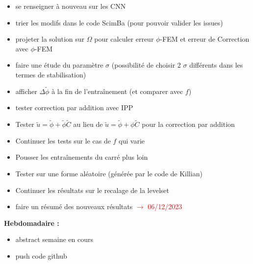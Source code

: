 \begin{itemize}[label=$\square$]
	\item se renseigner à nouveau sur les CNN
	\item trier les modifs dans le code ScimBa (pour pouvoir valider les issues)
	\item[\done] projeter la solution sur $\Omega$ pour calculer erreur $\phi$-FEM et erreur de Correction avec $\phi$-FEM
	\item faire une étude du paramètre $\sigma$ (possibilité de choisir 2 $\sigma$ différents dans les termes de stabilisation)
	\item afficher $\Delta \tilde{\phi}$ à la fin de l'entraînement (et comparer avec $f$)
	\item tester correction par addition avec IPP
	\item Tester $\tilde{u}=\tilde{\phi}+\tilde{\phi}\tilde{C}$ au lieu de $\tilde{u}=\tilde{\phi}+\phi\tilde{C}$ pour la correction par addition
	\item[\done] Continuer les tests sur le cas de $f$ qui varie
	\item Pousser les entraînements du carré plus loin
	\item Tester sur une forme aléatoire (générée par le code de Killian)
	\item[\done] Continuer les résultats sur le recalage de la levelset
	\item[\done] faire un résumé des nouveaux résultats \textcolor{red}{$\rightarrow$ 06/12/2023}
\end{itemize}
\textbf{Hebdomadaire :}
\begin{itemize}[label=$\square$]
	\item[\done] abstract semaine en cours
	\item[\done] push code github
\end{itemize}